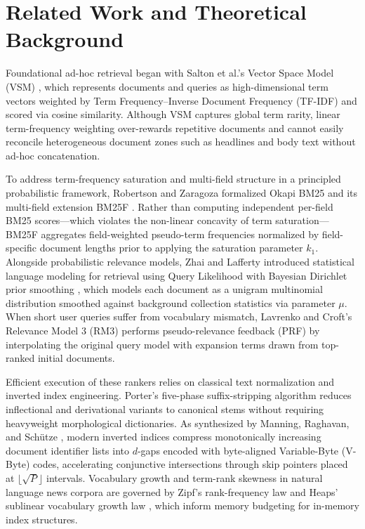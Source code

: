 \documentclass[conference]{IEEEtran}
\begin{document}
\section{Related Work and Theoretical Background}
Foundational ad-hoc retrieval began with Salton et al.'s Vector Space Model (VSM) \cite{b1}, which represents documents and queries as high-dimensional term vectors weighted by Term Frequency--Inverse Document Frequency (TF-IDF) and scored via cosine similarity. Although VSM captures global term rarity, linear term-frequency weighting over-rewards repetitive documents and cannot easily reconcile heterogeneous document zones such as headlines and body text without ad-hoc concatenation.

To address term-frequency saturation and multi-field structure in a principled probabilistic framework, Robertson and Zaragoza formalized Okapi BM25 and its multi-field extension BM25F \cite{b2}. Rather than computing independent per-field BM25 scores—which violates the non-linear concavity of term saturation—BM25F aggregates field-weighted pseudo-term frequencies normalized by field-specific document lengths prior to applying the saturation parameter $k_1$. Alongside probabilistic relevance models, Zhai and Lafferty introduced statistical language modeling for retrieval using Query Likelihood with Bayesian Dirichlet prior smoothing \cite{b3}, which models each document as a unigram multinomial distribution smoothed against background collection statistics via parameter $\mu$. When short user queries suffer from vocabulary mismatch, Lavrenko and Croft's Relevance Model 3 (RM3) \cite{b4} performs pseudo-relevance feedback (PRF) by interpolating the original query model with expansion terms drawn from top-ranked initial documents.

Efficient execution of these rankers relies on classical text normalization and inverted index engineering. Porter's five-phase suffix-stripping algorithm \cite{b5} reduces inflectional and derivational variants to canonical stems without requiring heavyweight morphological dictionaries. As synthesized by Manning, Raghavan, and Sch{\"u}tze \cite{b6}, modern inverted indices compress monotonically increasing document identifier lists into $d$-gaps encoded with byte-aligned Variable-Byte (V-Byte) codes, accelerating conjunctive intersections through skip pointers placed at $\lfloor\sqrt{P}\rfloor$ intervals. Vocabulary growth and term-rank skewness in natural language news corpora are governed by Zipf's rank-frequency law and Heaps' sublinear vocabulary growth law \cite{b7}, which inform memory budgeting for in-memory index structures.
\end{document}
